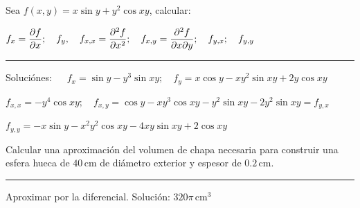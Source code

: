 
\vspace{1cm}
\begin{mipropuesto}

Sea $f(x,y)=x\sin y+y^2\cos xy$, calcular:

\vspace{5mm} \hspace{2cm} $\displaystyle f_x=\pdv{f}{x};\quad f_y, \quad f_{x,x}=\pdv[2]{f}{x};\quad f_{x,y}=\pdv[2]{f}{x}{y};\quad f_{y,x};\quad f_{y,y}$

\color{olive}
\rule{200pt}{0.2pt}
\color{black}


\begin{flushright}
		 Soluciónes: $\quad \ f_x=\sin y-y^3\sin xy;\quad f_y=x\cos y-xy^2\sin xy +2y\cos xy$
		 
		 \vspace{3mm} $f_{x,x}=-y^4 \cos xy;\quad f_{x,y}=\cos y-xy^3\cos xy-y^2\sin xy-2y^2\sin xy=f_{y,x}$
		 
		 \vspace{3mm} $f_{y,y}=-x\sin y-x^2y^2\cos xy-4xy\sin xy+2\cos xy$
\end{flushright}

\end{mipropuesto}

\vspace{1cm}
\begin{mipropuesto}

Calcular una aproximación del volumen de chapa necesaria para construir una esfera hueca de $40\, \mathrm{cm}$ de diámetro exterior y espesor de $0.2\, \mathrm{cm}$.

\color{olive}
\rule{200pt}{0.2pt}
\color{black}


\begin{flushright}
		Aproximar por la diferencial. Solución: $320\pi \, \mathrm{cm}^3$
\end{flushright}

\end{mipropuesto}


